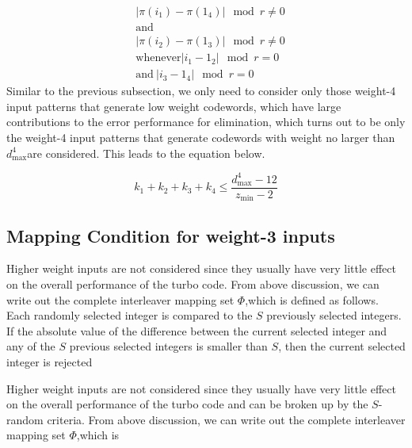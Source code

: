 \documentclass[11pt, oneside, dvipdfmx]{book}
\begin{document}
\begin{equation*}
   \begin{split}
 	&|\pi(i_1)-\pi(1_4)| \mod r \neq 0\\
 	&\text{and}\\
     &|\pi(i_2)-\pi(1_3)| \mod r \neq 0 \\
     &\text{whenever}
      |i_1-1_2| \mod r =0 \\
      &\text{and}~ |i_3-1_4| \mod r =0
      \end{split}
\end{equation*} 
Similar to the previous subsection, we only need to consider only those weight-4
input patterns that generate low weight codewords, which have large contributions to the error performance for elimination, which turns out to be only the weight-4 input patterns that generate codewords with weight no larger than $d^4_{\text{max}}$are considered. This leads to the equation below.

\begin{equation}
k_1+k_2+k_3+k_4  \leq \frac{d^4_{\text{max}}-12}{z_{\min}-2}
\end{equation}

\subsection{Mapping Condition for weight-3 inputs}
Higher weight inputs are not considered since they usually have very little effect on the overall performance of the turbo code. From above discussion, we can write out the complete interleaver mapping set $\Phi$,which is defined as follows. Each randomly selected integer is compared to the $S$ previously
selected integers. If the absolute value of the difference between
the current selected integer and any of the $S$ previous selected
integers is smaller than $S$, then the current selected integer is rejected




Higher weight inputs are not considered since they usually have very little effect on the overall performance of the turbo code and can be broken up by the $S$-random criteria. From above discussion, we can write out the complete interleaver mapping set $\Phi$,which is
\end{document}
